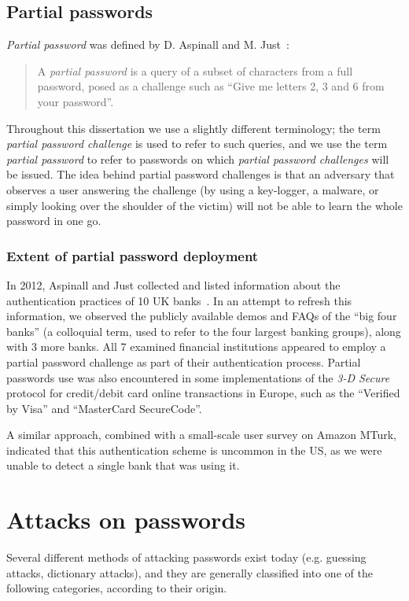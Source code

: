     \subsection{Partial passwords}
      \label{ssec:partial_passwords}
      \emph{Partial password} was defined by D. Aspinall and M. Just~\cite{part_pass}:
      \begin{quote}
      A \emph{partial password} is a query of a subset of characters from a full password, posed as a challenge such as ``Give me letters 2, 3 and 6 from your password''.
      \end{quote}
      Throughout this dissertation we use a slightly different terminology; the term \emph{partial password challenge} is used to refer to such queries, and we use the term \emph{partial password} to refer to passwords on which \emph{partial password challenges} will be issued. The idea behind partial password challenges is that an adversary that observes a user answering the challenge (\eg by using a key-logger, a malware, or simply looking over the shoulder of the victim) will not be able to learn the whole password in one go.

      \subsubsection{Extent of partial password deployment}
        \label{sssec:partial_pass_extent_use}
        In 2012, Aspinall and Just collected and listed information about the authentication practices of 10 UK banks~\cite{2fa_uk}. In an attempt to refresh this information, we observed the publicly available demos and FAQs of the ``big four banks'' (a colloquial term, used to refer to the four largest banking groups), along with 3 more banks. All 7 examined financial institutions appeared to employ a partial password challenge as part of their authentication process. Partial passwords use was also encountered in some implementations of the \emph{3-D Secure} protocol for credit/debit card online transactions in Europe, such as the ``Verified by Visa'' and ``MasterCard SecureCode''.

        A similar approach, combined with a small-scale user survey on Amazon MTurk, indicated that this authentication scheme is uncommon in the US, as we were unable to detect a single bank that was using it.


  \section{Attacks on passwords}
    \label{sec:password_attacks}
    Several different methods of attacking passwords exist today (e.g. guessing attacks, dictionary attacks), and they are generally classified into one of the following categories, according to their origin.


